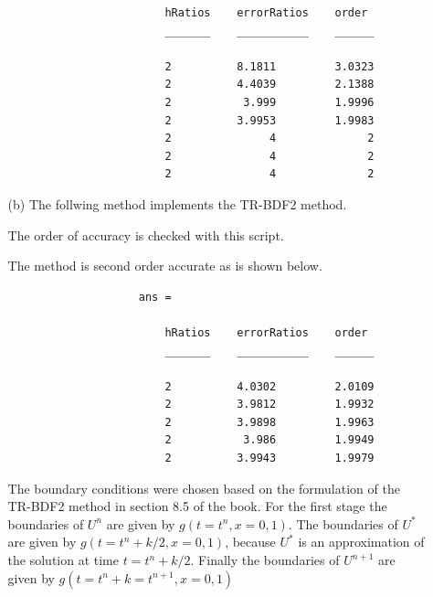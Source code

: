 \documentclass[11pt, oneside, titlepage]{article}
\begin{document}
\begin{enumerate}
\begin{enumerate}
\begin{verbatim}
                        hRatios    errorRatios    order 
                        _______    ___________    ______

                        2          8.1811         3.0323
                        2          4.4039         2.1388
                        2           3.999         1.9996
                        2          3.9953         1.9983
                        2               4              2
                        2               4              2
                        2               4              2
                \end{verbatim}

            \item[(b)] %
                The follwing method implements the TR-BDF2 method.
                
                The order of accuracy is checked with this script.
                

                The method is second order accurate as is shown below.
                \begin{verbatim}
                    ans = 

                        hRatios    errorRatios    order 
                        _______    ___________    ______

                        2          4.0302         2.0109
                        2          3.9812         1.9932
                        2          3.9898         1.9963
                        2           3.986         1.9949
                        2          3.9943         1.9979
                \end{verbatim}

                The boundary conditions were chosen based on the formulation
                of the TR-BDF2 method in section 8.5 of the book.
                For the first stage the boundaries of $U^n$ are given by
                $g(t = t^n, x = 0, 1)$.
                The boundaries of $U^*$ are given by $g(t = t^n + k/2, x = 0,1)$,
                because $U^*$ is an approximation of the solution at time $t = t^n + k/2$.
                Finally the boundaries of $U^{n+1}$ are given by
                $g(t = t^n + k = t^{n+1}, x = 0,1)$
        \end{enumerate}


\end{enumerate}
\end{document}
